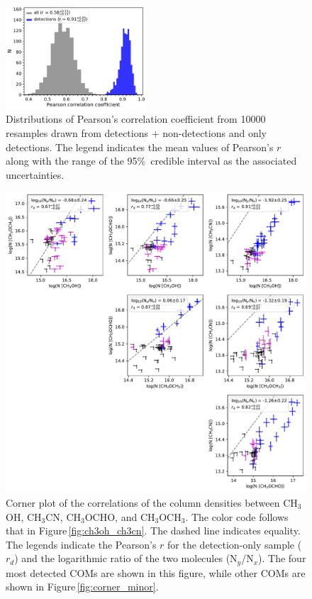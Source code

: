 \documentclass[twocolumn]{aastex62}
\newcommand{\methylformate}{\mbox{CH$_{3}$OCHO}}
\newcommand{\methanol}{\mbox{CH$_{3}$OH}}
\newcommand{\dimethylether}{\mbox{CH$_{3}$OCH$_{3}$}}
\newcommand{\methylcyanide}{\mbox{CH$_{3}$CN}}
\begin{document}
\begin{figure}[htbp!]
  \centering
  \includegraphics[width=0.47\textwidth]{pearson_r_ch3oh_ch3cn.pdf}
  \caption{Distributions of Pearson's correlation coefficient from 10000 resamples drawn from detections $+$ non-detections and only detections.  The legend indicates the mean values of Pearson's $r$ along with the range of the 95\%\ credible interval as the associated uncertainties.}
  \label{fig:pearson_distribution}
\end{figure}

\begin{figure}[htbp!]
  \centering
  \includegraphics[width=\textwidth]{corner_Ncol_correlations.pdf}
  \caption{Corner plot of the correlations of the column densities between \methanol, \methylcyanide, \methylformate, and \dimethylether.  The color code follows that in Figure\,\ref{fig:ch3oh_ch3cn}.  The dashed line indicates equality.  The legends indicate the Pearson's $r$ for the detection-only sample ($r_{d}$) and the logarithmic ratio of the two molecules (N$_{y}$/N$_{x}$).  The four most detected COMs are shown in this figure, while other COMs are shown in Figure\,\ref{fig:corner_minor}.}
  \label{fig:corner}
\end{figure}
\end{document}
